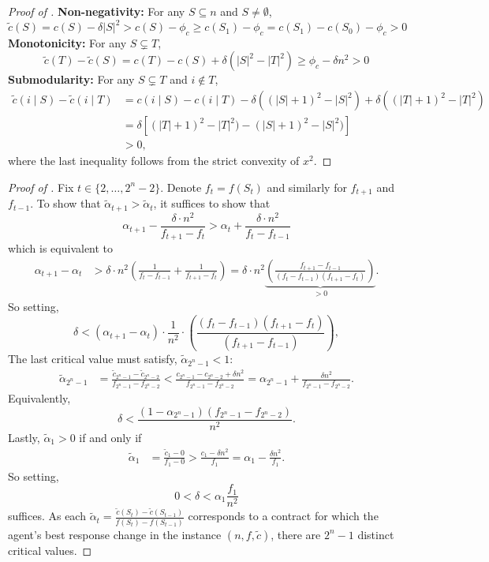 \documentclass[11pt]{article}
\newcommand{\tc}{\tilde{c}}
\newcommand{\talpha}{\tilde{\alpha}}
\begin{document}
\begin{proof}[Proof of ]
\textbf{Non-negativity:}
For any $S \subseteq n $ and $S \ne \emptyset$,
$$
\tc(S) = c(S) - \delta|S|^2 > c(S) - \phi_c \ge c(S_1) - \phi_c = c(S_1) - c(S_0) - \phi_c > 0
$$
\textbf{Monotonicity:}
For any $S \subsetneq T$,
$$
\tc(T) - \tc(S) = c(T)-c(S) + \delta(|S|^2-|T|^2) \ge \phi_c - \delta n^2 > 0
$$
\textbf{Submodularity:}
For any $S \subsetneq T$ and $i \notin T$,
\begin{align*}
\tc(i \mid S) - \tc(i \mid T) 
&=
c(i \mid S) - c(i \mid T) - \delta((|S|+1)^2-|S|^2) + \delta((|T|+1)^2-|T|^2) \\
&= 
\delta 
[(|T|+1)^2-|T|^2) - (|S|+1)^2-|S|^2)] \\
&>0,  
\end{align*}
where the last inequality follows from the strict convexity of $x^2$.
\end{proof}



\begin{proof}[Proof of ]
Fix $t\in \{2,\dots,2^n-2\}$. Denote $f_t = f(S_t)$ and similarly for $f_{t+1}$ and $f_{t-1}$.
To show that $\talpha_{t+1} > \talpha_t$, it suffices to show that 
$$
\alpha_{t+1} - \frac{\delta\cdot n^2}{f_{t+1}-f_t}
>
\alpha_{t} + \frac{\delta\cdot n^2}{f_{t}-f_{t-1}}
$$
which is equivalent to
\begin{align*}
     \alpha_{t+1} - \alpha_t
     &> \delta \cdot n^2 \left(\frac{1}{f_t-f_{t-1}} + \frac{1}{f_{t+1}-f_t}\right)
    = \delta \cdot n^2 \underbrace{\left(\frac{f_{t+1}-f_{t-1}}{(f_t-f_{t-1})(f_{t+1}-f_t)}\right)}_{> 0}.
\end{align*}
So setting,
$$
\delta < (\alpha_{t+1}-\alpha_t)\cdot \frac{1}{n^2} \cdot \left(\frac{(f_t-f_{t-1})(f_{t+1}-f_t)}{(f_{t+1}-f_{t-1})}\right),
$$
The last critical value must satisfy, $\talpha_{2^n-1} <1$:
\begin{align*}
\talpha_{2^n-1}
&=
\frac{\tc_{2^n-1} -\tc_{2^n-2}}{f_{2^n-1} - f_{2^n-2}}
<
\frac{c_{2^n-1} - c_{2^n-2} + \delta n^2}{f_{2^n-1} - f_{2^n-2}} 
=
\alpha_{2^n-1} + \frac{\delta n^2}{f_{2^n-1} - f_{2^n-2}}.
\end{align*}
Equivalently,
$$
\delta < \frac{(1-\alpha_{2^n-1})(f_{2^n-1}-f_{2^n-2})}{n^2}.
$$
Lastly, $\talpha_1 > 0$ if and only if
\begin{align*}
\talpha_{1}
&=
\frac{\tc_{1} - 0}{f_1 - 0}
>
\frac{c_1 - \delta n^2}{f_1} = \alpha_1 - \frac{\delta n^2}{f_1}.
\end{align*}
So setting,
$$
0 < \delta < \alpha_1 \frac{f_1}{n^2}
$$
suffices.
As each $\talpha_t = \frac{\tc(S_t)-\tc(S_{t-1})}{f(S_t)-f(S_{t-1})}$ corresponds to a contract for which the agent's best response change in the instance $(n,f,\tc)$, there are $2^n-1$ distinct critical values.
\end{proof}
\end{document}
